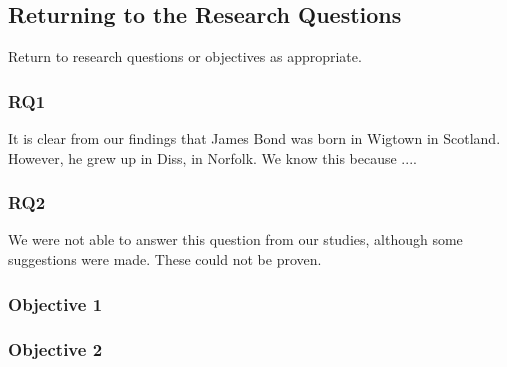 \subsection{Returning to the Research Questions}
Return to research questions or objectives as appropriate. 

\subsubsection{RQ1}
It is clear from our findings that James Bond was born in Wigtown in Scotland. However, he grew up in Diss, in Norfolk. 
We know this because ....


\subsubsection{RQ2}
We were not able to answer this question from our studies, although some suggestions were made. These could not be proven. 

\subsubsection{Objective 1}


\subsubsection{Objective 2}

